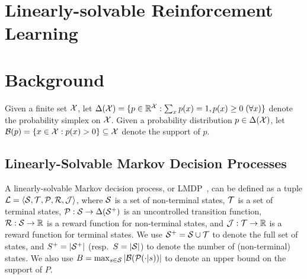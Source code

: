 \section{Linearly-solvable Reinforcement Learning}


\section{Background}


Given a finite set $\mathcal{X}$, let $\Delta(\cX)=\{p\in\real^\cX:\sum_x p(x)=1,\linebreak p(x)\geq 0\;(\forall x)\}$ denote the probability simplex on $\mathcal{X}$. Given a probability distribution $p\in\Delta(\mathcal{X})$, let $\mathcal{B}(p)=\{x\in\mathcal{X}:p(x) > 0\}\subseteq\mathcal{X}$ denote the support of $p$.


\subsection{Linearly-Solvable Markov Decision Processes}

A linearly-solvable Markov decision process, or LMDP~\citep{Todorov2006}, can be defined as a tuple $\mathcal{L}=\langle\mathcal{S},\mathcal{T},\mathcal{P},\mathcal{R},\mathcal{J}\rangle$, where $\mathcal{S}$ is a set of non-terminal states, $\mathcal{T}$ is a set of terminal states, $\mathcal{P}:\mathcal{S}\rightarrow\Delta(\mathcal{S}^+)$ is an uncontrolled transition function, $\mathcal{R}:\mathcal{S}\rightarrow\mathbb{R}$ is a reward function for non-terminal states, and $\mathcal{J}:\mathcal{T}\rightarrow\mathbb{R}$ is a reward function for terminal states. We use $\mathcal{S}^+=\mathcal{S}\cup\mathcal{T}$ to denote the full set of states, and $S^+=|\mathcal{S}^+|$ (resp.~$S=|\mathcal{S}|$) to denote the number of (non-terminal) states. 
We also use $B=\max_{s\in\mathcal{S}}|\mathcal{B}(\mathcal{P}(\cdot|s))|$ to denote an upper bound on the support of $P$.


